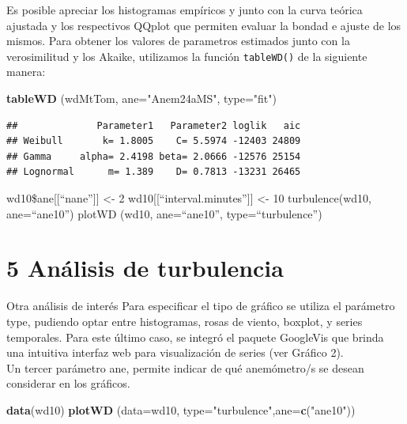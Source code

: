 \documentclass[]{article}
\newenvironment{Shaded}{\begin{snugshade}}{\end{snugshade}}
\newcommand{\KeywordTok}[1]{\textcolor[rgb]{0.13,0.29,0.53}{\textbf{{#1}}}}
\newcommand{\DataTypeTok}[1]{\textcolor[rgb]{0.13,0.29,0.53}{{#1}}}
\newcommand{\StringTok}[1]{\textcolor[rgb]{0.31,0.60,0.02}{{#1}}}
\newcommand{\NormalTok}[1]{{#1}}
\begin{document}
Es posible apreciar los histogramas empíricos y junto con la curva
teórica ajustada y los respectivos QQplot que permiten evaluar la bondad
e ajuste de los mismos. Para obtener los valores de parametros estimados
junto con la verosimilitud y los Akaike, utilizamos la función
\texttt{tableWD()} de la siguiente manera:

\begin{Shaded}
\begin{Highlighting}[]
\KeywordTok{tableWD} \NormalTok{(wdMtTom, }\DataTypeTok{ane=}\StringTok{"Anem24aMS"}\NormalTok{, }\DataTypeTok{type=}\StringTok{"fit"}\NormalTok{)}
\end{Highlighting}
\end{Shaded}

\begin{verbatim}
##              Parameter1   Parameter2 loglik   aic
## Weibull       k= 1.8005    C= 5.5974 -12403 24809
## Gamma     alpha= 2.4198 beta= 2.0666 -12576 25154
## Lognormal      m= 1.389    D= 0.7813 -13231 26465
\end{verbatim}

wd10\$ane{[}{[}``nane''{]}{]} \textless{}- 2
wd10{[}{[}``interval.minutes''{]}{]} \textless{}- 10 turbulence(wd10,
ane=``ane10'') plotWD (wd10, ane=``ane10'', type=``turbulence'')

\section{5 Análisis de turbulencia}\label{analisis-de-turbulencia}

Otra análisis de interés Para especificar el tipo de gráfico se utiliza
el parámetro type, pudiendo optar entre histogramas, rosas de viento,
boxplot, y series temporales. Para este último caso, se integró el
paquete GoogleVis que brinda una intuitiva interfaz web para
visualización de series (ver Gráfico 2).\\Un tercer parámetro ane,
permite indicar de qué anemómetro/s se desean considerar en los
gráficos.

\begin{Shaded}
\begin{Highlighting}[]
\KeywordTok{data}\NormalTok{(wd10)}
\KeywordTok{plotWD} \NormalTok{(}\DataTypeTok{data=}\NormalTok{wd10, }\DataTypeTok{type=}\StringTok{"turbulence"}\NormalTok{,}\DataTypeTok{ane=}\KeywordTok{c}\NormalTok{(}\StringTok{"ane10"}\NormalTok{))}
\end{Highlighting}
\end{Shaded}
\end{document}
